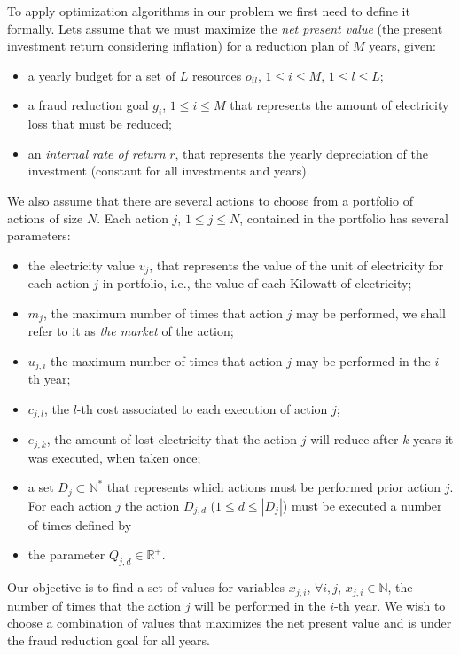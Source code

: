 
To apply optimization algorithms in our problem we first need to define it formally. Lets assume
that we must maximize the \textit{net present value} (the present investment return considering 
inflation) for a reduction plan of $M$ years, given:

\begin{itemize}
    \item a yearly budget for a set of $L$ resources $o_{il}$, $1 \le i \le M$, $1 \le l \le L$;
    
    \item a fraud reduction goal $g_i$, $1 \le i \le M$ that represents the
    amount of electricity loss that must be reduced;

    \item an \textit{internal rate of return} $r$, that represents the yearly depreciation of the investment
    (constant for all investments and years). 

\end{itemize}

We also assume that there are several actions to choose from a portfolio of actions of size $N$.
Each action $j$, $1 \le j \le N$, contained in the portfolio has several parameters: 
\begin{itemize}
    \item the electricity value $v_j$, that represents the value of the unit of electricity for each action $j$ in portfolio,
    i.e., the value of each Kilowatt of electricity;
    \item $m_j$, the maximum number of times that action $j$ may be performed, we
    shall refer to it as \textit{the market} of the action;
    \item $u_{j,i}$ the maximum number of times that action $j$ may be performed in the $i$-th year;
    \item $c_{j,l}$, the $l$-th cost associated to each execution of action $j$;
    \item $e_{j,k}$, the amount of lost electricity that the action $j$ will reduce after 
    $k$ years it was executed, when taken once;
    \item a set $D_j \subset \mathbb{N^*}$ that represents which actions must be performed prior action $j$.
    For each action $j$ the action $D_{j,d}$ ($1 \le d \le |D_j|$) must be executed a number of times defined by
    \item the parameter $Q_{j,d} \in \mathbb{R^+}$.
\end{itemize}

Our objective is to find a set of values for variables $x_{j,i}$, $\forall i,j$, $x_{j,i} \in \mathbb{N} $, 
the number of times that the action $j$ will be performed in the $i$-th year. We wish to choose a combination
of values that maximizes the net present value and is under the fraud reduction goal for all years. 

